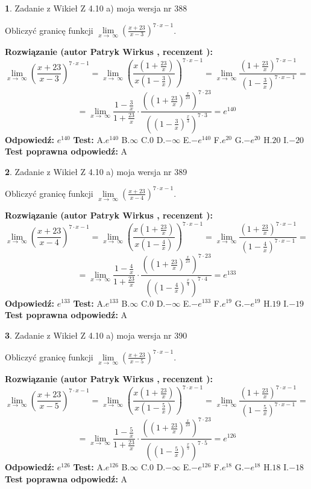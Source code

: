\documentclass[12pt, a4paper]{article}
\theoremstyle{definition} %
\newtheorem{zad}{}
\newcommand{\zadStart}[1]{\begin{zad}#1\newline}
\newcommand{\zadStop}{\end{zad}}
\newcommand{\rozwStart}[2]{\noindent \textbf{Rozwiązanie (autor #1 , recenzent #2): }\newline}
\newcommand{\rozwStop}{\newline}
\newcommand{\odpStart}{\noindent \textbf{Odpowiedź:}\newline}
\newcommand{\odpStop}{\newline}
\newcommand{\testStart}{\noindent \textbf{Test:}\newline}
\newcommand{\testStop}{\newline}
\newcommand{\kluczStart}{\noindent \textbf{Test poprawna odpowiedź:}\newline}
\newcommand{\kluczStop}{\newline}
\begin{document}
\zadStart{Zadanie z Wikieł Z 4.10 a) moja wersja nr 388}

Obliczyć granicę funkcji  $\lim\limits_{x\to\ \infty}(\frac{x+23}{x-3})^{7\cdot x-1}$.
\zadStop
\rozwStart{Patryk Wirkus}{}
$$\lim\limits_{x\to\ \infty}(\frac{x+23}{x-3})^{7\cdot x-1} = \lim\limits_{x\to\ \infty}(\frac{x(1+\frac{23}{x})}{x(1-\frac{3}{x})})^{7\cdot x-1}=\lim\limits_{x\to\ \infty}\frac{(1+\frac{23}{x})^{7\cdot x-1}}{(1-\frac{3}{x})^{7\cdot x-1}}=$$
$$=\lim\limits_{x\to\ \infty}\frac{1-\frac{3}{x}}{1+\frac{23}{x}}\cdot\frac{((1+\frac{23}{x})^{\frac{x}{23}})^{7\cdot23}}{((1-\frac{3}{x})^{\frac{x}{3}})^{7\cdot3}}=e^{140}$$
\rozwStop
\odpStart
$e^{140}$
\odpStop
\testStart
A.$e^{140}$ B.$\infty$ C.$0$ D.$-\infty$ E.$-e^{140}$
F.$e^{20}$ G.$-e^{20}$
H.$20$
I.$-20$
\testStop
\kluczStart
A
\kluczStop



\zadStart{Zadanie z Wikieł Z 4.10 a) moja wersja nr 389}

Obliczyć granicę funkcji  $\lim\limits_{x\to\ \infty}(\frac{x+23}{x-4})^{7\cdot x-1}$.
\zadStop
\rozwStart{Patryk Wirkus}{}
$$\lim\limits_{x\to\ \infty}(\frac{x+23}{x-4})^{7\cdot x-1} = \lim\limits_{x\to\ \infty}(\frac{x(1+\frac{23}{x})}{x(1-\frac{4}{x})})^{7\cdot x-1}=\lim\limits_{x\to\ \infty}\frac{(1+\frac{23}{x})^{7\cdot x-1}}{(1-\frac{4}{x})^{7\cdot x-1}}=$$
$$=\lim\limits_{x\to\ \infty}\frac{1-\frac{4}{x}}{1+\frac{23}{x}}\cdot\frac{((1+\frac{23}{x})^{\frac{x}{23}})^{7\cdot23}}{((1-\frac{4}{x})^{\frac{x}{4}})^{7\cdot4}}=e^{133}$$
\rozwStop
\odpStart
$e^{133}$
\odpStop
\testStart
A.$e^{133}$ B.$\infty$ C.$0$ D.$-\infty$ E.$-e^{133}$
F.$e^{19}$ G.$-e^{19}$
H.$19$
I.$-19$
\testStop
\kluczStart
A
\kluczStop



\zadStart{Zadanie z Wikieł Z 4.10 a) moja wersja nr 390}

Obliczyć granicę funkcji  $\lim\limits_{x\to\ \infty}(\frac{x+23}{x-5})^{7\cdot x-1}$.
\zadStop
\rozwStart{Patryk Wirkus}{}
$$\lim\limits_{x\to\ \infty}(\frac{x+23}{x-5})^{7\cdot x-1} = \lim\limits_{x\to\ \infty}(\frac{x(1+\frac{23}{x})}{x(1-\frac{5}{x})})^{7\cdot x-1}=\lim\limits_{x\to\ \infty}\frac{(1+\frac{23}{x})^{7\cdot x-1}}{(1-\frac{5}{x})^{7\cdot x-1}}=$$
$$=\lim\limits_{x\to\ \infty}\frac{1-\frac{5}{x}}{1+\frac{23}{x}}\cdot\frac{((1+\frac{23}{x})^{\frac{x}{23}})^{7\cdot23}}{((1-\frac{5}{x})^{\frac{x}{5}})^{7\cdot5}}=e^{126}$$
\rozwStop
\odpStart
$e^{126}$
\odpStop
\testStart
A.$e^{126}$ B.$\infty$ C.$0$ D.$-\infty$ E.$-e^{126}$
F.$e^{18}$ G.$-e^{18}$
H.$18$
I.$-18$
\testStop
\kluczStart
A
\kluczStop
\end{document}
